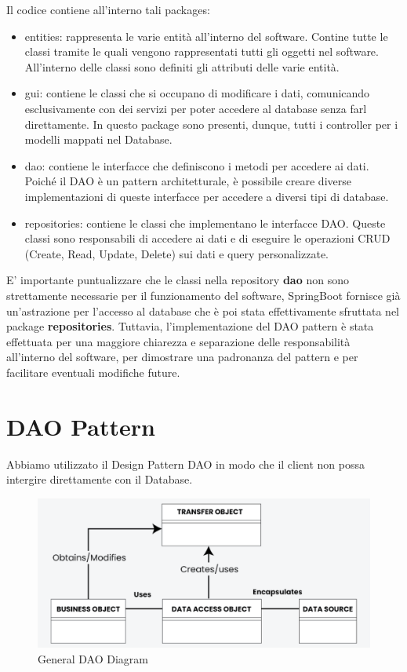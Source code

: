 \documentclass[twoside,openright,titlepage,fleqn,headinclude,12pt,a4paper,BCOR=5mm,footinclude]{scrbook}
\begin{document}
Il codice contiene all'interno tali packages:
\begin{itemize}
    \item entities: rappresenta le varie entità all'interno del software. Contine tutte le classi tramite le quali vengono rappresentati tutti gli oggetti nel software. All'interno delle classi sono definiti gli attributi delle varie entità.
    \item gui: contiene le classi che si occupano di modificare i dati, comunicando esclusivamente con dei servizi per poter accedere al database senza farl direttamente. In questo package sono presenti, dunque, tutti i controller per i modelli mappati nel Database.
    \item dao: contiene le interfacce che definiscono i metodi per accedere ai dati. Poiché il DAO è un pattern architetturale, è possibile creare diverse implementazioni di queste interfacce per accedere a diversi tipi di database.
    \item repositories: contiene le classi che implementano le interfacce DAO. Queste classi sono responsabili di accedere ai dati e di eseguire le operazioni CRUD (Create, Read, Update, Delete) sui dati e query personalizzate.

\end{itemize}
E' importante puntualizzare che le classi nella repository \textbf{dao} non sono strettamente necessarie per il funzionamento del software, SpringBoot fornisce già un'astrazione per l'accesso al database che è poi stata effettivamente sfruttata nel package \textbf{repositories}. Tuttavia, l'implementazione del DAO pattern è stata effettuata per una maggiore chiarezza e separazione delle responsabilità all'interno del software, per dimostrare una padronanza del pattern e per facilitare eventuali modifiche future.

\section{DAO Pattern}
Abbiamo utilizzato il Design Pattern DAO in modo che il client non possa intergire direttamente con il Database.


\begin{figure}[H]
  \centering
  \includegraphics[width=\linewidth]{images/daoDiagram.png}
  \caption{General DAO Diagram}
  \label{fig:Dao Diagram}
\end{figure}
\end{document}
